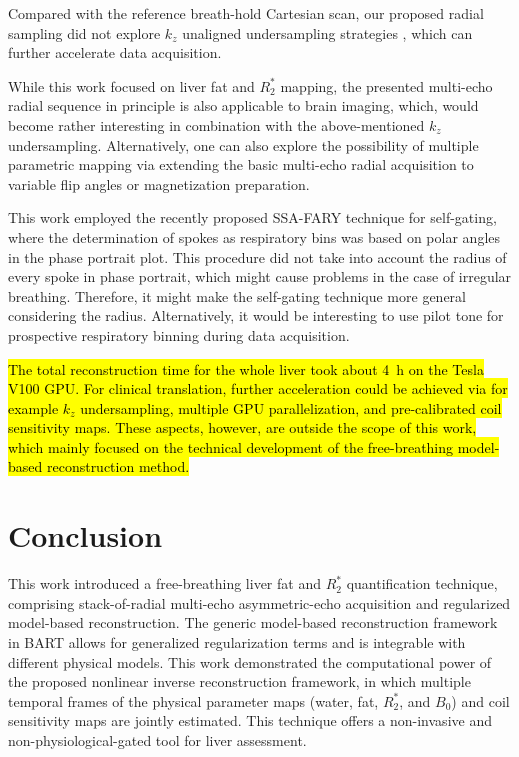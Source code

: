\documentclass[journal,twoside,web]{ieeecolor}
\begin{document}
Compared with the reference breath-hold Cartesian scan, 
our proposed radial sampling did not explore 
$k_z$ unaligned undersampling strategies \cite{breuer_2005_caipi}, 
which can further accelerate data acquisition.

While this work focused on liver fat and $R_2^*$ mapping, 
the presented multi-echo radial sequence in principle 
is also applicable to brain imaging, which, 
would become rather interesting in combination with 
the above-mentioned $k_z$ undersampling. 
Alternatively, one can also explore the possibility of 
multiple parametric mapping 
via extending the basic multi-echo radial acquisition to 
variable flip angles or magnetization preparation.

This work employed the recently proposed SSA-FARY technique 
for self-gating, where the determination of spokes as respiratory bins 
was based on polar angles in the phase portrait plot. 
This procedure did not take into account the radius of every spoke 
in phase portrait, which might cause problems in the case of irregular breathing. 
Therefore, it might make the self-gating technique more general considering the radius. Alternatively, it would be interesting to use 
pilot tone \cite{solomon_2021_pilot_tone} for prospective respiratory binning 
during data acquisition. 

\hl{The total reconstruction time for the whole liver took about \mbox{\SI{4}{\hour}} 
on the Tesla V100 GPU. For clinical translation, 
further acceleration could be achieved via 
for example \mbox{$k_z$} undersampling, multiple GPU parallelization, 
and pre-calibrated coil sensitivity maps. 
These aspects, however, are outside the scope of this work, 
which mainly focused on the technical development 
of the free-breathing model-based reconstruction method.}



\section{Conclusion}

This work introduced a free-breathing liver fat and $R_2^*$ quantification 
technique, comprising stack-of-radial multi-echo asymmetric-echo acquisition and 
regularized model-based reconstruction. 
The generic model-based reconstruction framework in BART allows for 
generalized regularization terms and is integrable with different physical models. 
This work demonstrated the computational power of 
the proposed nonlinear inverse reconstruction framework, 
in which multiple temporal frames of 
the physical parameter maps (water, fat, $R_2^*$, and $B_0$) 
and coil sensitivity maps are jointly estimated. 
This technique offers a non-invasive and non-physiological-gated tool 
for liver assessment. 
\end{document}

